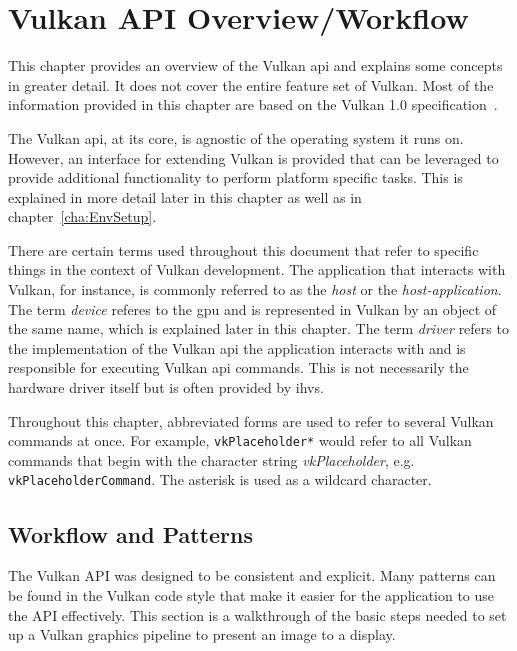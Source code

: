 
\chapter{Vulkan API Overview/Workflow}
\label{cha:VulkanOverview}
  This chapter provides an overview of the Vulkan \gls{api} and explains some concepts in greater detail.
  It does not cover the entire feature set of Vulkan.
  Most of the information provided in this chapter are based on the Vulkan 1.0 specification~\cite{vkspec}.

  The Vulkan \gls{api}, at its core, is agnostic of the operating system it runs on.
  However, an interface for extending Vulkan is provided that can be leveraged to provide additional functionality to perform platform specific tasks. This is explained in more detail later in this chapter as well as in chapter~\ref{cha:EnvSetup}.

  There are certain terms used throughout this document that refer to specific things in the context of Vulkan development.
  The application that interacts with Vulkan, for instance, is commonly referred to as the \textit{host} or the \textit{host-application}.
  The term \textit{device} referes to the \gls{gpu} and is represented in Vulkan by an object of the same name, which is explained later in this chapter.
  The term \textit{\gls{driver}} refers to the implementation of the Vulkan \gls{api} the application interacts with and is responsible for executing Vulkan \gls{api} commands.
  This is not necessarily the hardware driver itself but is often provided by \glspl{ihv}.

  Throughout this chapter, abbreviated forms are used to refer to several Vulkan commands at once.
  For example, \lstinline{vkPlaceholder*} would refer to all Vulkan commands that begin with the character string \textit{vkPlaceholder}, e.g. \lstinline{vkPlaceholderCommand}. The asterisk is used as a wildcard character.

  \section{Workflow and Patterns}
  \label{sec:WorkflowAndPatterns}
    The Vulkan API was designed to be consistent and explicit. Many patterns can be found in the Vulkan code style that make it easier for the \gls{application} to use the API effectively. This section is a walkthrough of the basic steps needed to set up a Vulkan graphics pipeline to present an image to a display.

